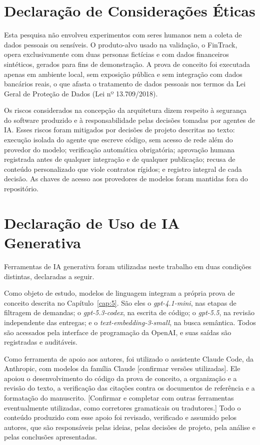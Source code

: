 \section*{Declaração de Considerações Éticas}
\thispagestyle{empty}
Esta pesquisa não envolveu experimentos com seres humanos nem a coleta de dados pessoais ou sensíveis. O produto-alvo usado na validação, o FinTrack, opera exclusivamente com duas personas fictícias e com dados financeiros sintéticos, gerados para fins de demonstração. A prova de conceito foi executada apenas em ambiente local, sem exposição pública e sem integração com dados bancários reais, o que afasta o tratamento de dados pessoais nos termos da Lei Geral de Proteção de Dados (Lei nº 13.709/2018).

Os riscos considerados na concepção da arquitetura dizem respeito à segurança do software produzido e à responsabilidade pelas decisões tomadas por agentes de IA. Esses riscos foram mitigados por decisões de projeto descritas no texto: execução isolada do agente que escreve código, sem acesso de rede além do provedor do modelo; verificação automática obrigatória; aprovação humana registrada antes de qualquer integração e de qualquer publicação; recusa de conteúdo personalizado que viole contratos rígidos; e registro integral de cada decisão. As chaves de acesso aos provedores de modelos foram mantidas fora do repositório.

\section*{Declaração de Uso de IA Generativa}
Ferramentas de IA generativa foram utilizadas neste trabalho em duas condições distintas, declaradas a seguir.

Como objeto de estudo, modelos de linguagem integram a própria prova de conceito descrita no Capítulo~\ref{cap:5}. São eles o \textit{gpt-4.1-mini}, nas etapas de filtragem de demandas; o \textit{gpt-5.3-codex}, na escrita de código; o \textit{gpt-5.5}, na revisão independente das entregas; e o \textit{text-embedding-3-small}, na busca semântica. Todos são acessados pela interface de programação da OpenAI, e suas saídas são registradas e auditáveis.

Como ferramenta de apoio aos autores, foi utilizado o assistente Claude Code, da Anthropic, com modelos da família Claude [confirmar versões utilizadas]. Ele apoiou o desenvolvimento do código da prova de conceito, a organização e a revisão do texto, a verificação das citações contra os documentos de referência e a formatação do manuscrito. [Confirmar e completar com outras ferramentas eventualmente utilizadas, como corretores gramaticais ou tradutores.] Todo o conteúdo produzido com esse apoio foi revisado, verificado e assumido pelos autores, que são responsáveis pelas ideias, pelas decisões de projeto, pela análise e pelas conclusões apresentadas.
\clearpage
